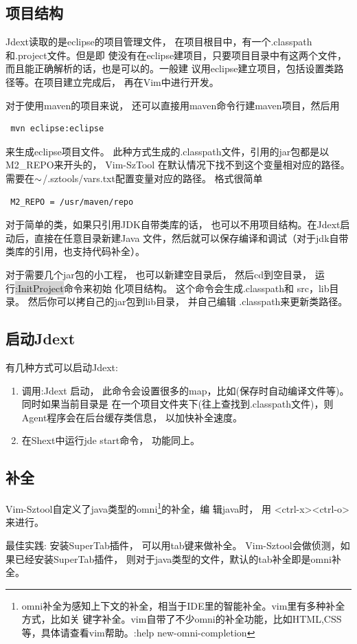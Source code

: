 \documentclass[oneside,openany]{book}
\begin{document}
\subsection{项目结构}
    Jdext读取的是eclipse的项目管理文件， 在项目根目中，有一个.classpath和.project文件。但是即
使没有在eclipse建项目，只要项目目录中有这两个文件，而且能正确解析的话，也是可以的。一般建
议用eclipse建立项目，包括设置类路径等。在项目建立完成后， 再在Vim中进行开发。

   对于使用maven的项目来说， 还可以直接用maven命令行建maven项目，然后用
  \begin{verbatim} mvn eclipse:eclipse \end{verbatim}
  来生成eclipse项目文件。 此种方式生成的.classpath文件，引用的jar包都是以M2\_REPO来开头的， Vim-SzTool
在默认情况下找不到这个变量相对应的路径。 需要在$\tiny{\sim}$/.sztools/vars.txt配置变量对应的路径。 格式很简单
  \begin{verbatim} M2_REPO = /usr/maven/repo \end{verbatim}

   对于简单的类，如果只引用JDK自带类库的话， 也可以不用项目结构。在Jdext启动后，直接在任意目录新建Java
文件，然后就可以保存编译和调试（对于jdk自带类库的引用，也支持代码补全）。
  
   对于需要几个jar包的小工程， 也可以新建空目录后， 然后cd到空目录， 运行\colorbox{lightgray}{:InitProject}命令来初始
化项目结构。 这个命令会生成.classpath和 src，lib目录。 然后你可以拷自己的jar包到lib目录， 并自己编辑
.classpath来更新类路径。

\subsection{启动Jdext}
   有几种方式可以启动Jdext:
    \begin{enumerate}
      \item 调用:Jdext 启动， 此命令会设置很多的map，比如(保存时自动编译文件等)。 同时如果当前目录是
  在一个项目文件夹下(往上查找到.classpath文件)，则Agent程序会在后台缓存类信息， 以加快补全速度。
      \item 在Shext中运行jde start命令， 功能同上。
    \end{enumerate}

\subsection{补全}
    Vim-Sztool自定义了java类型的omni\footnote{omni补全为感知上下文的补全，相当于IDE里的智能补全。vim里有多种补全方式，比如关
    键字补全。vim自带了不少omni的补全功能，比如HTML,CSS等，具体请查看vim帮助。:help new-omni-completion }的补全，编
    辑java时， 用 <ctrl-x><ctrl-o> 来进行。
    \begin{mdframed}[style=BestPracticeFrame]
      最佳实践: 安装SuperTab插件， 可以用tab键来做补全。
      Vim-Sztool会做侦测，如果已经安装SuperTab插件， 则对于java类型的文件，默认的tab补全即是omni补全。
    \end{mdframed}
\end{document}
